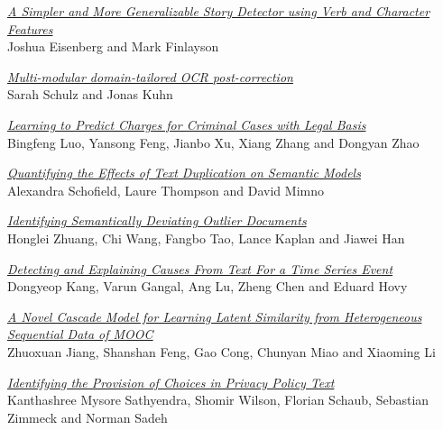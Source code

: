\hyperlink{page.2691}{\em A Simpler and More Generalizable Story Detector using Verb and Character Features}\samepage \\
\hspace*{7mm} Joshua Eisenberg and Mark Finlayson\dotfill {}

\hyperlink{page.2699}{\em Multi-modular domain-tailored OCR post-correction}\samepage \\
\hspace*{7mm} Sarah Schulz and Jonas Kuhn\dotfill {}

\hyperlink{page.2710}{\em Learning to Predict Charges for Criminal Cases with Legal Basis}\samepage \\
\hspace*{7mm} Bingfeng Luo, Yansong Feng, Jianbo Xu, Xiang Zhang and Dongyan Zhao\dotfill {}

\hyperlink{page.2720}{\em Quantifying the Effects of Text Duplication on Semantic Models}\samepage \\
\hspace*{7mm} Alexandra Schofield, Laure Thompson and David Mimno\dotfill {}

\hyperlink{page.2731}{\em Identifying Semantically Deviating Outlier Documents}\samepage \\
\hspace*{7mm} Honglei Zhuang, Chi Wang, Fangbo Tao, Lance Kaplan and Jiawei Han\dotfill {}

\hyperlink{page.2741}{\em Detecting and Explaining Causes From Text For a Time Series Event}\samepage \\
\hspace*{7mm} Dongyeop Kang, Varun Gangal, Ang Lu, Zheng Chen and Eduard Hovy\dotfill {}

\hyperlink{page.2751}{\em A Novel Cascade Model for Learning Latent Similarity from Heterogeneous Sequential Data of MOOC}\samepage \\
\hspace*{7mm} Zhuoxuan Jiang, Shanshan Feng, Gao Cong, Chunyan Miao and Xiaoming Li\dotfill {}

\hyperlink{page.2757}{\em Identifying the Provision of Choices in Privacy Policy Text}\samepage \\
\hspace*{7mm} Kanthashree Mysore Sathyendra, Shomir Wilson, Florian Schaub, Sebastian Zimmeck and Norman Sadeh\dotfill {}

